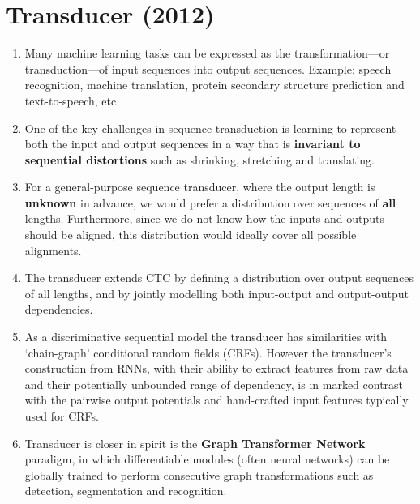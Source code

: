 \chapter{Transducer (2012)}

\begin{tcolorbox}
\end{tcolorbox}



\begin{enumerate}
    \item Many machine learning tasks can be expressed as the transformation—or transduction—of input sequences into output sequences. 
    Example: speech recognition, machine translation, protein secondary structure prediction and text-to-speech, etc
    \hfill \cite{arxiv/1211.3711/Sequence-Transduction-RNN}

    \item One of the key challenges in sequence transduction is learning to represent both the input and output sequences in a way that is \textbf{invariant to sequential distortions} such as shrinking, stretching and translating.
    \hfill \cite{arxiv/1211.3711/Sequence-Transduction-RNN}

    \item For a general-purpose sequence transducer, where the output length is \textbf{unknown} in advance, we would prefer a distribution over sequences of \textbf{all} lengths.
    Furthermore, since we do not know how the inputs and outputs should be aligned, this distribution would ideally cover all possible alignments.
    \hfill \cite{arxiv/1211.3711/Sequence-Transduction-RNN}

    \item The transducer extends CTC by defining a distribution over output sequences of all lengths, and by jointly modelling both input-output and output-output dependencies.
    \hfill \cite{arxiv/1211.3711/Sequence-Transduction-RNN}

    \item As a discriminative sequential model the transducer has similarities with ‘chain-graph’ conditional random fields (CRFs).
    However the transducer’s construction from RNNs, with their ability to extract features from raw data and their potentially unbounded range of dependency, is in marked contrast with the pairwise output potentials and hand-crafted input features typically used for CRFs.
    \hfill \cite{arxiv/1211.3711/Sequence-Transduction-RNN}

    \item Transducer is closer in spirit is the \textbf{Graph Transformer Network} paradigm, in which differentiable modules (often neural networks) can be globally trained to perform consecutive graph transformations such as detection, segmentation and recognition.
    \hfill \cite{arxiv/1211.3711/Sequence-Transduction-RNN}
\end{enumerate}




